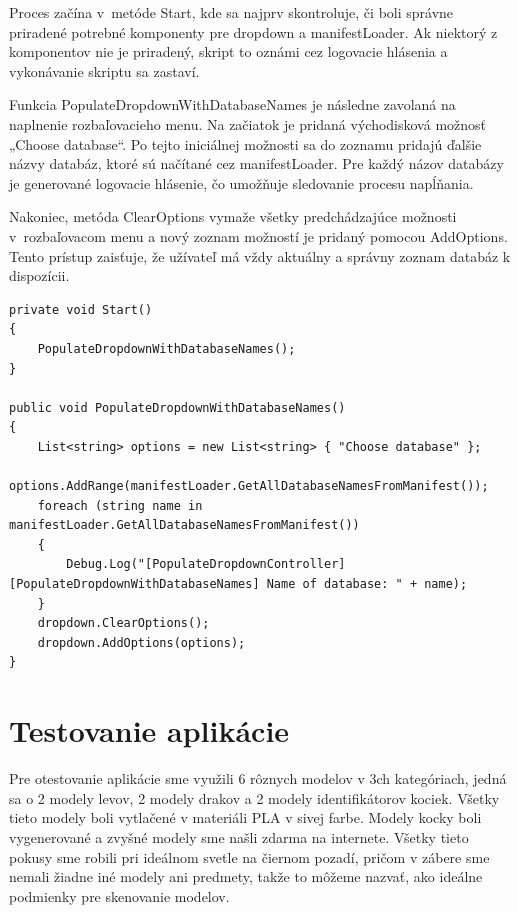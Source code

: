 Proces začína v~metóde Start, kde sa najprv skontroluje, či boli správne priradené potrebné komponenty pre dropdown a manifestLoader. Ak niektorý z komponentov nie je priradený, skript to oznámi cez logovacie hlásenia a vykonávanie skriptu sa zastaví.

Funkcia PopulateDropdownWithDatabaseNames je následne zavolaná na naplnenie rozbaľovacieho menu. Na začiatok je pridaná východisková možnosť „Choose database“. Po tejto iniciálnej možnosti sa do zoznamu pridajú ďalšie názvy databáz, ktoré sú načítané cez manifestLoader. Pre každý názov databázy je generované logovacie hlásenie, čo umožňuje sledovanie procesu napĺňania.

Nakoniec, metóda ClearOptions vymaže všetky predchádzajúce možnosti v~rozbaľovacom menu a nový zoznam možností je pridaný pomocou AddOptions. Tento prístup zaisťuje, že užívateľ má vždy aktuálny a správny zoznam databáz k dispozícii.

\lstset{style=Csharp}
\begin{lstlisting}[caption={PopulateDropdownController Class - Čítanie z xml a pridávanie databáz do rozbaľovacieho listu}, label=populateDropdownController]
private void Start()
{
    PopulateDropdownWithDatabaseNames();
}

public void PopulateDropdownWithDatabaseNames()
{
    List<string> options = new List<string> { "Choose database" };
    options.AddRange(manifestLoader.GetAllDatabaseNamesFromManifest());
    foreach (string name in manifestLoader.GetAllDatabaseNamesFromManifest())
    {
        Debug.Log("[PopulateDropdownController] [PopulateDropdownWithDatabaseNames] Name of database: " + name);
    }
    dropdown.ClearOptions();
    dropdown.AddOptions(options);
}
\end{lstlisting} 

\section{Testovanie aplikácie}

Pre otestovanie aplikácie sme využili 6 rôznych modelov v 3ch kategóriach, jedná sa o 2 modely levov, 2 modely drakov a 2 modely identifikátorov kociek. Všetky tieto modely boli vytlačené v materiáli PLA v sivej farbe. Modely kocky boli vygenerované a zvyšné modely sme našli zdarma na internete. Všetky tieto pokusy sme robili pri ideálnom svetle na čiernom pozadí, pričom v zábere sme nemali žiadne iné modely ani predmety, takže to môžeme nazvať, ako ideálne podmienky pre skenovanie modelov. 

